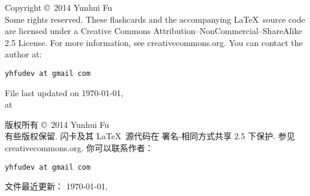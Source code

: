\documentclass[avery5371,grid]{flashcards}
\begin{document}
\begin{flashcard}{Copyright \copyright \, 2014 Yunhui Fu\\
Some rights reserved.}
These flashcards and the accompanying \LaTeX \, source code are licensed
under a Creative Commons Attribution--NonCommercial--ShareAlike 2.5 License.  
For more information, see creativecommons.org.  You can contact the author at:
\begin{center}
\begin{small}\tt yhfudev at gmail com\end{small}

\medskip
File last updated on \today, \\
at \currenttime
\end{center}
\end{flashcard}

\begin{flashcard}[版权申明]{版权所有 \copyright \, 2014 Yunhui Fu\\
有些版权保留.}
闪卡及其 \LaTeX \, 源代码在
署名-相同方式共享 2.5 下保护.
参见 creativecommons.org.  你可以联系作者：
\begin{center}
\begin{small}\tt yhfudev at gmail com\end{small}

\medskip
文件最近更新： \today, \\
\currenttime
\end{center}
\end{flashcard}







\end{document}

